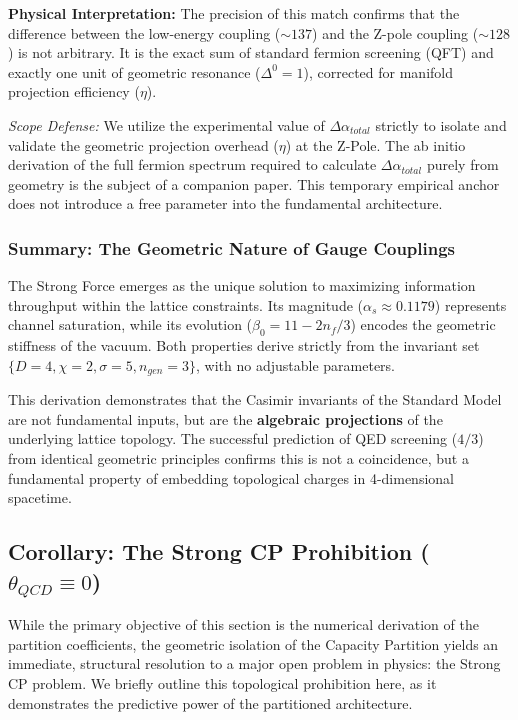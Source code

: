 \textbf{Physical Interpretation:} The precision of this match confirms that the difference between the low-energy coupling ($\sim 137$) and the Z-pole coupling ($\sim 128$) is not arbitrary. It is the exact sum of standard fermion screening (QFT) and exactly one unit of geometric resonance ($\Delta^0=1$), corrected for manifold projection efficiency ($\eta$).

\textit{Scope Defense:} We utilize the experimental value of $\Delta\alpha_{total}$ strictly to isolate and validate the geometric projection overhead ($\eta$) at the Z-Pole. The ab initio derivation of the full fermion spectrum required to calculate $\Delta\alpha_{total}$ purely from geometry is the subject of a companion paper. This temporary empirical anchor does not introduce a free parameter into the fundamental architecture.

\subsubsection{Summary: The Geometric Nature of Gauge Couplings}
The Strong Force emerges as the unique solution to maximizing information throughput within the lattice constraints. Its magnitude ($\alpha_s \approx 0.1179$) represents channel saturation, while its evolution ($\beta_0 = 11 - 2n_f/3$) encodes the geometric stiffness of the vacuum. Both properties derive strictly from the invariant set $\{D=4, \chi=2, \sigma=5, n_{gen}=3\}$, with no adjustable parameters.

This derivation demonstrates that the Casimir invariants of the Standard Model are not fundamental inputs, but are the \textbf{algebraic projections} of the underlying lattice topology. The successful prediction of QED screening ($4/3$) from identical geometric principles confirms this is not a coincidence, but a fundamental property of embedding topological charges in 4-dimensional spacetime.

\subsection{Corollary: The Strong CP Prohibition (\texorpdfstring{$\theta_{QCD} \equiv 0$}{theta\_QCD = 0})}
\label{sec:strong_cp_prohibition}

While the primary objective of this section is the numerical derivation of the partition coefficients, the geometric isolation of the Capacity Partition yields an immediate, structural resolution to a major open problem in physics: the Strong CP problem. We briefly outline this topological prohibition here, as it demonstrates the predictive power of the partitioned architecture.

